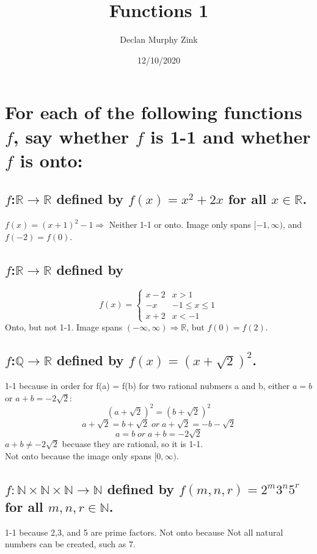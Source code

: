 \documentclass[12pt]{article}
\begin{document}
\title{Functions 1}
\author{Declan Murphy Zink}
\date{12/10/2020}
\maketitle

\setcounter{section}{0}

\section{
    For each of the following functions $f$, say whether $f$ is 1-1 and whether $f$ is onto:
}
\subsection{$f$:$\mathds{R} \rightarrow \mathds{R}$ defined by $f(x)=x^2+2x$ for all $x \in \mathds{R}$.}
$f(x) = (x+1)^2 -1 \Rightarrow$ Neither 1-1 or onto. Image only spans $[-1, \infty)$, and $f(-2) = f(0)$.

\subsection{$f$:$\mathds{R} \rightarrow \mathds{R}$ defined by}
\[ f(x) = 
\begin{cases} 
    x-2 & x > 1\\
    -x & -1 \leq x \leq 1 \\
    x+2 & x < -1 
\end{cases}
\]
Onto, but not 1-1. Image spans $(-\infty, \infty) \Rightarrow \mathds{R}$, but $f(0) = f(2)$.

\subsection{$f$:$\mathds{Q} \rightarrow \mathds{R}$ defined by $f(x) = (x+ \sqrt{2})^2$.}

1-1 because in order for f(a) = f(b) for two rational nubmers a and b, either $a = b$ or $a+b = -2 \sqrt{2}:$\\
$$(a+\sqrt{2})^2 = (b+\sqrt{2})^2$$
$$a+\sqrt{2} = b+\sqrt{2} \; or \; a+\sqrt{2} = -b-\sqrt{2}$$
$$a = b \; or \; a+b = -2 \sqrt{2}$$
$a+b \neq -2 \sqrt{2}$ becuase they are rational, so it is 1-1.\\
Not onto because the image only spans $[0, \infty)$.

\subsection{$f: \mathds{N} \times \mathds{N} \times\mathds{N} \rightarrow \mathds{N}$ defined by $f(m,n,r) = 2^m 3^n 5^r$ for all $m,n,r \in \mathds{N}$.}
1-1 because 2,3, and 5 are prime factors. Not onto because Not all natural numbers can be created, such as 7.
\end{document}
